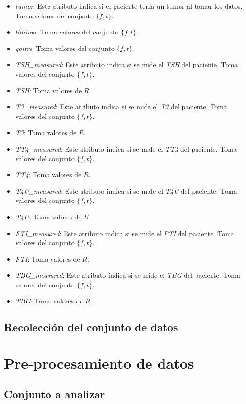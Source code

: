 \documentclass[osajnl,twocolumn,showpacs,superscriptaddress,10pt,floatfix]{revtex4-1} %
\begin{document}
\begin{itemize}
    \item \textit{tumor}: Este atributo indica si el paciente tenía un tumor al tomar los datos. Toma valores del conjunto $\{f, t\}$.
    \item \textit{lithium}: Toma valores del conjunto $\{f, t\}$.
    \item \textit{goitre}: Toma valores del conjunto $\{f, t\}$.
    \item \textit{TSH\_measured}: Este atributo indica si se mide el \textit{TSH} del paciente. Toma valores del conjunto $\{f, t\}$.
    \item \textit{TSH}: Toma valores de $R$.
    \item \textit{T3\_measured}: Este atributo indica si se mide el \textit{T3} del paciente. Toma valores del conjunto $\{f, t\}$.
    \item \textit{T3}: Toma valores de $R$.
    \item \textit{TT4\_measured}: Este atributo indica si se mide el \textit{TT4} del paciente. Toma valores del conjunto $\{f, t\}$.
    \item \textit{TT4}: Toma valores de $R$.
    \item \textit{T4U\_measured}: Este atributo indica si se mide el \textit{T4U} del paciente. Toma valores del conjunto $\{f, t\}$.
    \item \textit{T4U}: Toma valores de $R$.
    \item \textit{FTI\_measured}: Este atributo indica si se mide el \textit{FTI} del paciente. Toma valores del conjunto $\{f, t\}$.
    \item \textit{FTI}: Toma valores de $R$.
    \item \textit{TBG\_measured}: Este atributo indica si se mide el \textit{TBG} del paciente. Toma valores del conjunto $\{f, t\}$.
    \item \textit{TBG}: Toma valores de $R$.
\end{itemize}

\subsection{Recolección del conjunto de datos}

\section{Pre-procesamiento de datos}
\subsection{Conjunto a analizar}
\end{document}
